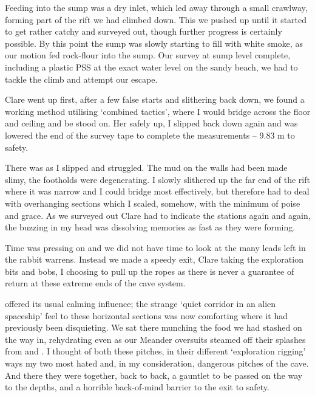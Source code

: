 Feeding into the sump was a dry inlet,
which led away through a small crawlway, forming part of the rift we had climbed down. 
This we pushed up until it started
to get rather catchy and surveyed out, though further progress is
certainly possible. 
By this point the sump was slowly starting to fill with white smoke, as our motion fed rock-flour into the sump. 
Our survey at sump level complete, including a plastic
PSS at the exact water level on the sandy beach, we had to tackle the climb and attempt our escape. 

Clare
went up first, after a few false starts and slithering back down, we
found a working method utilising `combined tactics', where I would
bridge across the floor and ceiling and be stood on. Her safely up, I
slipped back down again and was lowered the end of the survey tape to
complete the measurements -- 9.83 m to safety.

There was  as I slipped and struggled. The
mud on the walls had been made slimy, the footholds were degenerating. I
slowly slithered up the far end of the rift where it was narrow and I
could bridge most effectively, but therefore had to deal with
overhanging sections which I scaled, somehow, with the minimum of poise
and grace. As we surveyed out Clare had to indicate the stations again
and again, the buzzing in my head was dissolving memories as fast as
they were forming.

Time was pressing on and we did not have time to look at the many leads
left in the rabbit warrens. Instead we made a speedy exit, Clare taking
the exploration bits and bobs, I choosing to pull up the ropes as there
is never a guarantee of return at these extreme ends of the cave system.


 offered its usual calming influence; the strange `quiet
corridor in an alien spaceship' feel to these horizontal sections was
now comforting where it had previously been disquieting. We sat there munching the food
we had stashed on the way in, rehydrating even as our Meander oversuits
steamed off their splashes from  and . I thought  of both these pitches, in their
different `exploration rigging' ways my two most hated and, in my
consideration, dangerous pitches of the cave. And there they were
together, back to back, a gauntlet to be passed on the way to the
depths, and a horrible back-of-mind barrier to the exit to safety.

